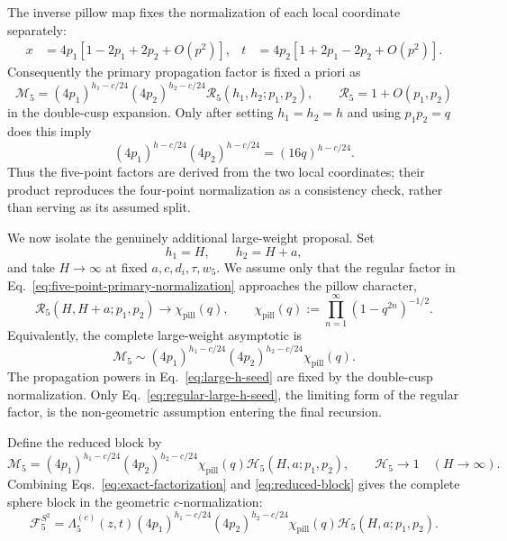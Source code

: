 \documentclass[11pt]{article}
\newcommand{\cF}{\mathcal F}
\newcommand{\cH}{\mathcal H}
\newcommand{\cM}{\mathcal M}
\begin{document}
The inverse pillow map fixes the normalization of each local coordinate
separately:
\begin{align}
 x&=4p_1\left[1-2p_1+2p_2+O(p^2)\right],
 &
 t&=4p_2\left[1+2p_1-2p_2+O(p^2)\right].
 \label{eq:local-coordinate-leading-four}
\end{align}
Consequently the primary propagation factor is fixed a priori as
\begin{equation}
 \boxed{
 \cM_5
 =(4p_1)^{h_1-c/24}(4p_2)^{h_2-c/24}
  \mathcal R_5(h_1,h_2;p_1,p_2),}
 \qquad
 \mathcal R_5=1+O(p_1,p_2)
 \label{eq:five-point-primary-normalization}
\end{equation}
in the double-cusp expansion.  Only after setting $h_1=h_2=h$ and using
$p_1p_2=q$ does this imply
\begin{equation}
 (4p_1)^{h-c/24}(4p_2)^{h-c/24}
 =(16q)^{h-c/24}.
 \label{eq:four-point-reduction-of-segments}
\end{equation}
Thus the five-point factors are derived from the two local coordinates;
their product reproduces the four-point normalization as a consistency
check, rather than serving as its assumed split.

\pagebreak[3]
We now isolate the genuinely additional large-weight proposal.  Set
\begin{equation}
 h_1=H,\qquad h_2=H+a,
 \label{eq:fixed-difference}
\end{equation}
and take $H\to\infty$ at fixed $a,c,d_i,\tau,w_5$.  We assume only that
the regular factor in Eq.~\eqref{eq:five-point-primary-normalization}
approaches the pillow character,
\begin{equation}
 \mathcal R_5(H,H+a;p_1,p_2)
 \longrightarrow\chi_{\mathrm{pill}}(q),
 \qquad
 \chi_{\mathrm{pill}}(q)
 :=\prod_{n=1}^{\infty}(1-q^{2n})^{-1/2}.
 \label{eq:regular-large-h-seed}
\end{equation}
Equivalently, the complete large-weight asymptotic is
\begin{equation}
 \cM_5
 \sim
 (4p_1)^{h_1-c/24}(4p_2)^{h_2-c/24}
 \chi_{\mathrm{pill}}(q).
 \label{eq:large-h-seed}
\end{equation}
The propagation powers in Eq.~\eqref{eq:large-h-seed} are fixed by the
double-cusp normalization.  Only Eq.~\eqref{eq:regular-large-h-seed}, the
limiting form of the regular factor, is the non-geometric assumption
entering the final recursion.

Define the reduced block by
\begin{equation}
 \cM_5
 =
 (4p_1)^{h_1-c/24}(4p_2)^{h_2-c/24}
 \chi_{\mathrm{pill}}(q)
 \cH_5(H,a;p_1,p_2),
 \qquad
 \cH_5\longrightarrow1
 \quad(H\to\infty).
 \label{eq:reduced-block}
\end{equation}
Combining Eqs.~\eqref{eq:exact-factorization} and
\eqref{eq:reduced-block} gives the complete sphere block in the geometric
$c$-normalization:
\begin{equation}
 \boxed{
 \cF^{S^2}_5
 =\Lambda_5^{(c)}(z,t)
 (4p_1)^{h_1-c/24}(4p_2)^{h_2-c/24}
 \chi_{\mathrm{pill}}(q)
 \cH_5(H,a;p_1,p_2).}
 \label{eq:full-block-c}
\end{equation}
\end{document}
